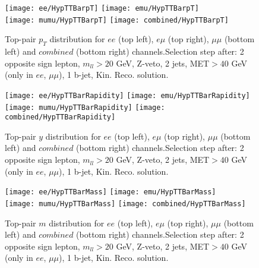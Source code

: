 \documentclass[12pt, a4paper, titlepage]{article}
\begin{document}
\clearpage
\newpage




\begin{figure}
  \texttt{[image: ee/HypTTBarpT]}
  \texttt{[image: emu/HypTTBarpT]}\\
  \texttt{[image: mumu/HypTTBarpT]}
  \texttt{[image: combined/HypTTBarpT]}
\caption{Top-pair $p_T$ distribution for $ee$ (top left), $e\mu$ (top right), $\mu\mu$ (bottom left) and $combined$ (bottom right) channels.\newline Selection step after: 2 opposite sign lepton, $m_{ll}>20$ GeV, Z-veto, 2 jets, MET$>40$ GeV (only in $ee$, $\mu\mu$), 1 b-jet, Kin. Reco. solution.}
\end{figure}

\clearpage
\newpage

\begin{figure}
  \texttt{[image: ee/HypTTBarRapidity]}
  \texttt{[image: emu/HypTTBarRapidity]}\\
  \texttt{[image: mumu/HypTTBarRapidity]}
  \texttt{[image: combined/HypTTBarRapidity]}
\caption{Top-pair $y$ distribution for $ee$ (top left), $e\mu$ (top right), $\mu\mu$ (bottom left) and $combined$ (bottom right) channels.\newline Selection step after: 2 opposite sign lepton, $m_{ll}>20$ GeV, Z-veto, 2 jets, MET$>40$ GeV (only in $ee$, $\mu\mu$), 1 b-jet, Kin. Reco. solution.}
\end{figure}

\clearpage
\newpage


\begin{figure}
  \texttt{[image: ee/HypTTBarMass]}
  \texttt{[image: emu/HypTTBarMass]}\\
  \texttt{[image: mumu/HypTTBarMass]}
  \texttt{[image: combined/HypTTBarMass]}
\caption{Top-pair $m$ distribution for $ee$ (top left), $e\mu$ (top right), $\mu\mu$ (bottom left) and $combined$ (bottom right) channels.\newline Selection step after: 2 opposite sign lepton, $m_{ll}>20$ GeV, Z-veto, 2 jets, MET$>40$ GeV (only in $ee$, $\mu\mu$), 1 b-jet, Kin. Reco. solution.}
\end{figure}
\end{document}
